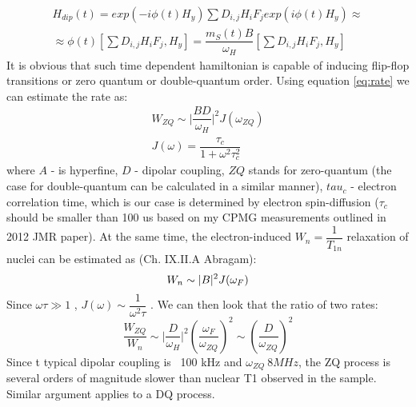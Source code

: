 \documentclass[a4paper, 12pt]{article}
\begin{document}
\begin{equation}
\begin{array}{cc}
H_{dip} (t) =  exp(-i \phi(t) H_y) \sum D_{i,j} H_i F_j exp(i \phi(t) H_y)  \approx  \\
\approx \phi(t)[ \sum D_{i,j} H_i F_j, H_y] = \dfrac{m_S(t) B}{\omega_H} [ \sum D_{i,j} H_i F_j, H_y]
\end{array}
\end{equation}
It is obvious that such time dependent hamiltonian is capable of inducing flip-flop transitions or zero quantum or double-quantum order. Using equation \ref{eq:rate} we can estimate the rate as:
\begin{equation}
\begin{array}{cc}
W_{ZQ}  \sim \vert \dfrac{B D}{\omega_H} \vert ^2 J(\omega_{ZQ}) \\
J(\omega) = \dfrac{\tau_c}{1+\omega^2\tau_c^2}
\end{array}
\end{equation}
where $A$ - is hyperfine, $D$ - dipolar coupling, $ZQ$ stands for zero-quantum (the case for double-quantum can be calculated in a similar manner), $tau_c$ - electron correlation time, which is our case is determined by electron spin-diffusion ($\tau_c$ should be smaller than 100 us based on my CPMG measurements outlined in 2012 JMR paper). At the same time, the electron-induced $W_n = \dfrac{1}{T_{1n}}$ relaxation of nuclei can be estimated as (Ch. IX.II.A Abragam):
\begin{equation}
W_{n}  \sim \vert B \vert ^2 J(\omega_F) \\
\end{equation}
Since $\omega \tau \gg 1$ ,  $J(\omega) \sim \dfrac{1}{\omega^2 \tau}$ . We can then look that the ratio of two rates:
\begin{equation}
\dfrac{W_{ZQ}}{W_n} \sim \vert \dfrac{D}{\omega_H} \vert^2 (\dfrac{\omega_F}{\omega_{ZQ}})^2 \sim (\dfrac{D}{\omega_{ZQ}})^2
\end{equation}
Since t typical dipolar coupling is ~100 kHz and $\omega_{ZQ} ~ 8 MHz$, the ZQ process is several orders of magnitude slower than nuclear T1 observed in the sample. Similar argument applies to a DQ process. 
\end{document}
